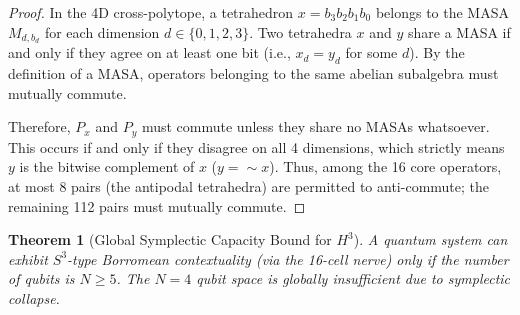 \documentclass[11pt]{article}
\newtheorem{theorem}{Theorem}[section]
\begin{document}
\begin{proof}
In the 4D cross-polytope, a tetrahedron $x = b_3 b_2 b_1 b_0$ belongs to the MASA $M_{d, b_d}$ for each dimension $d \in \{0,1,2,3\}$. Two tetrahedra $x$ and $y$ share a MASA if and only if they agree on at least one bit (i.e., $x_d = y_d$ for some $d$). By the definition of a MASA, operators belonging to the same abelian subalgebra must mutually commute.

Therefore, $P_x$ and $P_y$ must commute unless they share no MASAs whatsoever. This occurs if and only if they disagree on all 4 dimensions, which strictly means $y$ is the bitwise complement of $x$ ($y = \sim x$). Thus, among the 16 core operators, at most 8 pairs (the antipodal tetrahedra) are permitted to anti-commute; the remaining 112 pairs must mutually commute.
\end{proof}

\begin{theorem}[Global Symplectic Capacity Bound for $H^3$]
\label{thm:symp-collapse}
A quantum system can exhibit $S^3$-type Borromean contextuality (via the 16-cell nerve) only if the number of qubits is $N \ge 5$. The $N=4$ qubit space is globally insufficient due to symplectic collapse.
\end{theorem}
\end{document}
